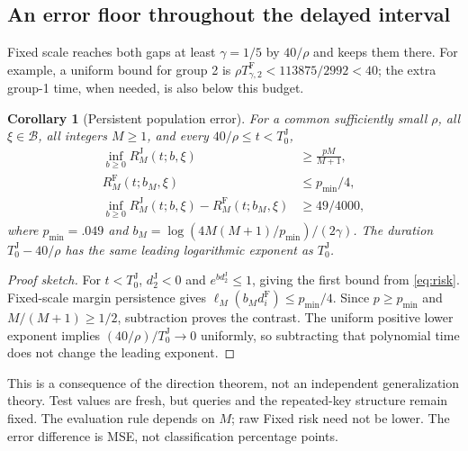 \documentclass[10pt,a4paper]{article}
\newtheorem{corollary}[theorem]{Corollary}
\newenvironment{sketch}{\begin{proof}[Proof sketch]}{\end{proof}}
\newcommand{\B}{\mathcal B}
\newcommand{\J}{\mathrm J}
\newcommand{\F}{\mathrm F}
\begin{document}
\subsection{An error floor throughout the delayed interval}
Fixed scale reaches both gaps at least $\gamma=1/5$ by $40/\rho$ and keeps them there. For example, a uniform bound for group 2 is $\rho T_{\gamma,2}^{\F}<113875/2992<40$; the extra group-1 time, when needed, is also below this budget.
\begin{corollary}[Persistent population error]\label{cor:floor}
For a common sufficiently small $\rho$, all $\xi\in\B$, all integers $M\ge1$, and every $40/\rho\le t<T_0^\J$,
\begin{equation}
\begin{split}
\inf_{b\ge0}R_M^\J(t;b,\xi)&\ge\frac{pM}{M+1},\\
R_M^\F(t;b_M,\xi)&\le p_{\min}/4,\\
\inf_{b\ge0}R_M^\J(t;b,\xi)-R_M^\F(t;b_M,\xi)&\ge49/4000,
\end{split}\label{eq:floor}
\end{equation}
where $p_{\min}=.049$ and $b_M=\log(4M(M+1)/p_{\min})/(2\gamma)$.
The duration $T_0^\J-40/\rho$ has the same leading logarithmic exponent as $T_0^\J$.
\end{corollary}
\begin{sketch}
For $t<T_0^\J$, $d_2^\J<0$ and $e^{bd_2^\J}\le1$, giving the first bound from \eqref{eq:risk}. Fixed-scale margin persistence gives $\ell_M(b_Md_i^\F)\le p_{\min}/4$. Since $p\ge p_{\min}$ and $M/(M+1)\ge1/2$, subtraction proves the contrast. The uniform positive lower exponent implies $(40/\rho)/T_0^\J\to0$ uniformly, so subtracting that polynomial time does not change the leading exponent.
\end{sketch}
This is a consequence of the direction theorem, not an independent generalization theory. Test values are fresh, but queries and the repeated-key structure remain fixed. The evaluation rule depends on $M$; raw Fixed risk need not be lower. The error difference is MSE, not classification percentage points.
\end{document}

